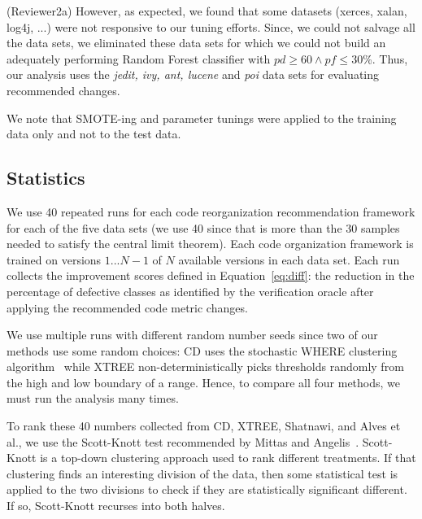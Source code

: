 \documentclass[twocolumn,5p]{elsarticle}
\newcommand{\eq}[1]{Equation~\ref{eq:#1}}
\theoremstyle{break}
\begin{document}
	
	{\color{steel2} (Reviewer2a) However, as expected, we found that some 
	datasets (xerces, 
	xalan, log4j, 
	...) were not responsive to our tuning efforts. Since, we could not salvage 
	all the data 
	sets, we eliminated these data sets for which we could not build 
	an adequately performing Random Forest classifier with $\mathit{pd}\ge 60 
	\wedge \mathit{pf} \le 30$\%. Thus, our analysis uses the {\em jedit, ivy, 
	ant, lucene} and {\em poi} data sets for evaluating recommended changes.}
	
	We note that SMOTE-ing and
	parameter tunings were applied to the training data only and not to the 
	test data.
	
	\subsection{Statistics}
	
	
	We use 40 repeated runs for each code reorganization recommendation 
	framework 
	for each of the five data sets (we use 40 since that is  more than the 30 
	samples  needed to satisfy the central limit theorem). Each code 
	organization framework is trained on versions $1...N-1$ of $N$ available 
	versions in each data set.
	Each run collects the improvement scores defined in \eq{diff}: the 
	reduction in the percentage of defective classes as identified by the 
	verification oracle after applying the recommended code metric changes.
	
	We use multiple runs with different random number seeds since two of our 
	methods use some random choices: CD uses the  stochastic WHERE clustering 
	algorithm~\cite{me12d}
	while XTREE non-deterministically picks thresholds randomly from
	the high and low boundary of a range.
	Hence, to compare all
	four methods, we must run the analysis many times.
	
	
	
	
	
	To rank these 40 numbers collected from CD, XTREE, Shatnawi, and Alves et 
	al., we use the Scott-Knott test recommended by Mittas and 
	Angelis~\cite{mittas13}.
	Scott-Knott is a top-down clustering approach used to rank different
	treatments. If that clustering finds an interesting division of the data, 
	then
	some statistical test is applied to the two divisions to check if they
	are statistically significant different. If so, Scott-Knott recurses
	into both halves.
	
\end{document}

